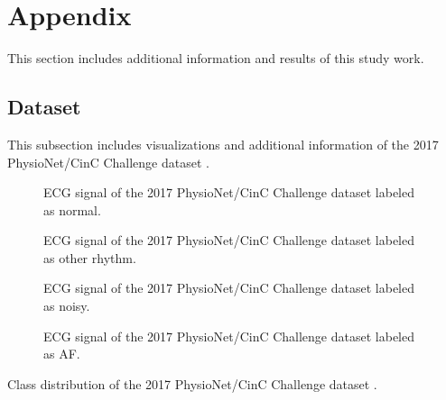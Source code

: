 \section{Appendix} \label{sec:appendix}

This section includes additional information and results of this study work.

\subsection{Dataset} \label{subsec:dataset_samples}

This subsection includes visualizations and additional information of the 2017 PhysioNet/CinC Challenge dataset \cite{Clifford2017}.

\begin{figure}[!ht]
    \setlength{\figH}{4cm}
    \setlength{\figW}{88.9mm}
    \centering
    
    \caption{ECG signal of the 2017 PhysioNet/CinC Challenge dataset \cite{Clifford2017} labeled as normal.}
    \label{fig:ecg_signal_N}
\end{figure}

\begin{figure}[!ht]
    \setlength{\figH}{4cm}
    \setlength{\figW}{88.9mm}
    \centering
    
    \caption{ECG signal of the 2017 PhysioNet/CinC Challenge dataset \cite{Clifford2017} labeled as other rhythm.}
    \label{fig:ecg_signal_O}
\end{figure}

\begin{figure}[!ht]
    \setlength{\figH}{4cm}
    \setlength{\figW}{88.9mm}
    \centering
    
    \caption{ECG signal of the 2017 PhysioNet/CinC Challenge dataset \cite{Clifford2017} labeled as noisy.}
    \label{fig:ecg_signal_tild}
\end{figure}

\begin{figure}[!ht]
    \setlength{\figH}{4cm}
    \setlength{\figW}{88.9mm}
    \centering
    
    \caption{ECG signal of the 2017 PhysioNet/CinC Challenge dataset \cite{Clifford2017} labeled as AF.}
    \label{fig:ecg_signal_A}
\end{figure}

\begin{table}[!ht]
    \centering
    \caption{Class distribution of the 2017 PhysioNet/CinC Challenge dataset \cite{Clifford2017}.}
    
    \label{tab:physionet_distribution}
\end{table}

